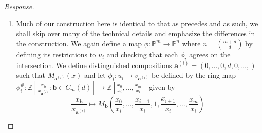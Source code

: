 \documentclass[english,letter,doublesided]{article}
\renewcommand\vec{\mathbf}
\newcommand{\evat}[3]{\left. #1\right|_{#2}^{#3}}
\DeclareMathOperator{\spec}{Spec}
\newcommand{\mor}{\mathrm{Mor}}
\newcommand{\ZZ}{\mathbb{Z}}
\newcommand{\PP}{\mathbb{P}}
\theoremstyle{remark}
\theoremstyle{definition}
\newcommand{\id}{\mathrm{id} }
\newcommand{\im}{\mathrm{Im}}
\newcommand{\cat}[1]{{\mathrm{\bf{#1}}}}
\newcommand{\restr}[2]{{\evat{#1}{#2}{}}}
\newcommand{\fv}[2]{\frac{x_{#1}}{x_{#2}}}
\newcommand{\va}{\vec{a}}
\newcommand{\vai}[1]{\va^{(#1)}}
\begin{document}
\begin{proof}[Response]
\begin{enumerate}[label=\textit{(\roman*)}]
Letting $S$ be a scheme, we let $\PP^k_S=\PP^k\times_{\ZZ}S$ and have (from problem 7)\footnote{ooh fun a forward reference!} that there is a natural\footnote{Is this a correct usage of the word natural? I'm not sure\textemdash all I mean by it is that the bijection is induced by the universal property of the product.} bijection $\mor_\cat{Sch}(\PP^m_S,\PP^n_S)\equiv \mor_\cat{Sch}(\PP^m_S,\PP^k)\times \mor_\cat{Sch}(\PP^m_S,S)$. We consider $\Phi$, the map given by $(\phi,\id_S)$ in the case that $S=\spec k$ and restrict to $u_i\times_\ZZ S\cong \spec \ZZ[\fv{0}{i},\hdots,\fv{m}{i}]\otimes_\ZZ k\cong \spec k[\fv{0}{i},\hdots,\fv{m}{i}]\subset \PP^m_S$. 
Then, $\restr{\Phi}{{u_i\times_\ZZ S}}:u_i\times_\ZZ S\to v_i\times_\ZZ S$ 
corresponds to the ring morphism $ \restr{\Phi}{{u_{i} {\times}_{\ZZ} S}}^\#:k[\fv{0}{i},\hdots,\fv{n}{i}]\to k[\fv{0}{i},\hdots,\fv{m}{i}]$ by  \begin{equation*}
\fv{\ell}{i}\mapsto \begin{cases}
\fv{\ell}{i}&\ell\leq m\\0&\text{else}
\end{cases}\end{equation*}
So for any $k$-point $\gamma:\spec k\to \PP^m_k$ over $S$ corresponding to $[a_0:\hdots:a_m]$ where $a_j=\gamma_i(\fv{j}{i})$ for some $i$ such that $\im(\gamma)\subset u_i$ as topological spaces when $j\neq i$ and $a_i=1$, we have that the $k$-point of $\PP^n_k$ given by $\Phi\circ \gamma$ corresponds to the composition of ring maps $k[\fv{0}{i},\hdots,\fv{n}{i}]\to k[\fv{0}{i},\hdots,\fv{m}{i}]\to k$ by 
\begin{equation*}
	\fv{\ell}{i}\mapsto \begin{cases}
	\fv{\ell}{i}&\ell\leq m\\
	0&else
	\end{cases}\mapsto  \begin{cases}
\gamma_i(	\fv{\ell}{i})=a_i&\ell\leq m\\
	0&else
	\end{cases}
\end{equation*}
and hence the induced map on $k$-points is given by $[a_0:\hdots:a_m]\mapsto [a_0:\hdots:a_m:0:\hdots:0]$
	\item Much of our construction here is identical to that as precedes and as such, we shall skip over many of the technical details and emphasize the differences in the construction. We again define a map $\phi:\PP^m\to \PP^n$ where $n={m+d\choose d}$ by defining its restrictions to $u_i$ and checking that each $\phi_i$ agrees on the intersection. We define distinguished compositions $\vec{a}^{(i)}=(0,\hdots,0,d,0,\hdots,)$ such that $M_{\vai{i}}(x)$ and let $\phi_i:u_i\to v_{\vec{a}^{(i)}}$ be defined by the ring map $\phi_i^\#:\ZZ[\fv{\vec{b}}{\vai{i}}:\vec{b}\in C_m(d)]\to \ZZ[\fv{0}{i},\hdots,\fv{m}{i}]$ given by $$\fv{\vec{b}}{\vai{i}}\mapsto M_{\vec{b}}\left(\fv{0}{i},\hdots,\fv{i-1}{i},1,\fv{i+1}{i},\hdots,\fv{m}{i}\right)$$

\end{enumerate}
\end{proof}
\end{document}
